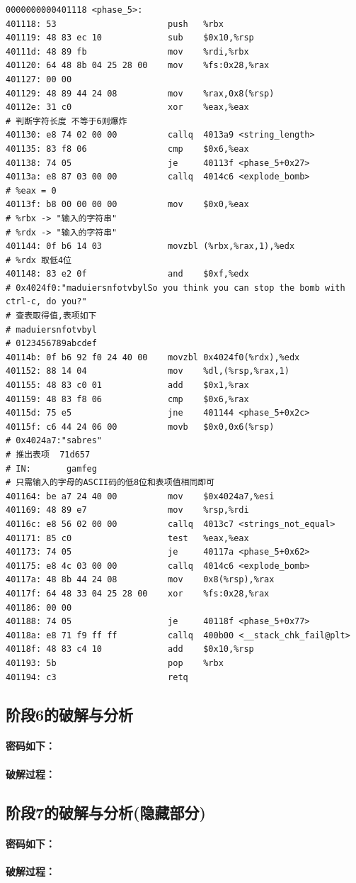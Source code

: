 \begin{lstlisting}
0000000000401118 <phase_5>:
401118:	53                   	push   %rbx
401119:	48 83 ec 10          	sub    $0x10,%rsp
40111d:	48 89 fb             	mov    %rdi,%rbx
401120:	64 48 8b 04 25 28 00 	mov    %fs:0x28,%rax
401127:	00 00 
401129:	48 89 44 24 08       	mov    %rax,0x8(%rsp)
40112e:	31 c0                	xor    %eax,%eax
# 判断字符长度 不等于6则爆炸
401130:	e8 74 02 00 00       	callq  4013a9 <string_length>
401135:	83 f8 06             	cmp    $0x6,%eax
401138:	74 05                	je     40113f <phase_5+0x27>
40113a:	e8 87 03 00 00       	callq  4014c6 <explode_bomb>
# %eax = 0
40113f:	b8 00 00 00 00       	mov    $0x0,%eax
# %rbx -> "输入的字符串"
# %rdx -> "输入的字符串"
401144:	0f b6 14 03          	movzbl (%rbx,%rax,1),%edx
# %rdx 取低4位
401148:	83 e2 0f             	and    $0xf,%edx
# 0x4024f0:"maduiersnfotvbylSo you think you can stop the bomb with ctrl-c, do you?"
# 查表取得值,表项如下
# maduiersnfotvbyl
# 0123456789abcdef
40114b:	0f b6 92 f0 24 40 00 	movzbl 0x4024f0(%rdx),%edx
401152:	88 14 04             	mov    %dl,(%rsp,%rax,1)
401155:	48 83 c0 01          	add    $0x1,%rax
401159:	48 83 f8 06          	cmp    $0x6,%rax
40115d:	75 e5                	jne    401144 <phase_5+0x2c>
40115f:	c6 44 24 06 00       	movb   $0x0,0x6(%rsp)
# 0x4024a7:"sabres"
# 推出表项  71d657
# IN:       gamfeg
# 只需输入的字母的ASCII码的低8位和表项值相同即可
401164:	be a7 24 40 00       	mov    $0x4024a7,%esi
401169:	48 89 e7             	mov    %rsp,%rdi
40116c:	e8 56 02 00 00       	callq  4013c7 <strings_not_equal>
401171:	85 c0                	test   %eax,%eax
401173:	74 05                	je     40117a <phase_5+0x62>
401175:	e8 4c 03 00 00       	callq  4014c6 <explode_bomb>
40117a:	48 8b 44 24 08       	mov    0x8(%rsp),%rax
40117f:	64 48 33 04 25 28 00 	xor    %fs:0x28,%rax
401186:	00 00 
401188:	74 05                	je     40118f <phase_5+0x77>
40118a:	e8 71 f9 ff ff       	callq  400b00 <__stack_chk_fail@plt>
40118f:	48 83 c4 10          	add    $0x10,%rsp
401193:	5b                   	pop    %rbx
401194:	c3                   	retq   
\end{lstlisting}

\subsection{阶段6的破解与分析}

\paragraph{密码如下：}

\paragraph{破解过程：}

\subsection{阶段7的破解与分析(隐藏部分)}

\paragraph{密码如下：}

\paragraph{破解过程：}
